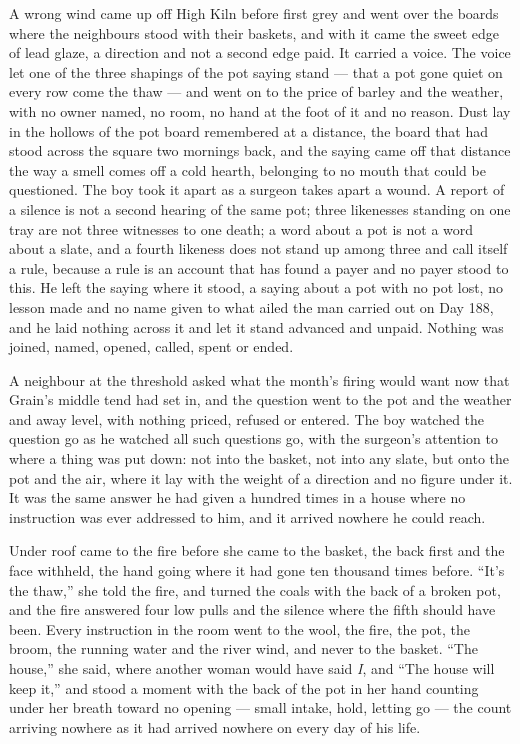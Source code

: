 \scenebreak

A wrong wind came up off High Kiln before first grey and went over the boards where the neighbours stood with their baskets, and with it came the sweet edge of lead glaze, a direction and not a second edge paid. It carried a voice. The voice let one of the three shapings of the pot saying stand --- that a pot gone quiet on every row come the thaw --- and went on to the price of barley and the weather, with no owner named, no room, no hand at the foot of it and no reason. Dust lay in the hollows of the pot board remembered at a distance, the board that had stood across the square two mornings back, and the saying came off that distance the way a smell comes off a cold hearth, belonging to no mouth that could be questioned. The boy took it apart as a surgeon takes apart a wound. A report of a silence is not a second hearing of the same pot; three likenesses standing on one tray are not three witnesses to one death; a word about a pot is not a word about a slate, and a fourth likeness does not stand up among three and call itself a rule, because a rule is an account that has found a payer and no payer stood to this. He left the saying where it stood, a saying about a pot with no pot lost, no lesson made and no name given to what ailed the man carried out on Day 188, and he laid nothing across it and let it stand advanced and unpaid. Nothing was joined, named, opened, called, spent or ended.

\scenebreak

A neighbour at the threshold asked what the month's firing would want now that Grain's middle tend had set in, and the question went to the pot and the weather and away level, with nothing priced, refused or entered. The boy watched the question go as he watched all such questions go, with the surgeon's attention to where a thing was put down: not into the basket, not into any slate, but onto the pot and the air, where it lay with the weight of a direction and no figure under it. It was the same answer he had given a hundred times in a house where no instruction was ever addressed to him, and it arrived nowhere he could reach.

Under  roof  came to the fire before she came to the basket, the back first and the face withheld, the hand going where it had gone ten thousand times before. “It's the thaw,” she told the fire, and turned the coals with the back of a broken pot, and the fire answered four low pulls and the silence where the fifth should have been. Every instruction in the room went to the wool, the fire, the pot, the broom, the running water and the river wind, and never to the basket. “The house,” she said, where another woman would have said \emph{I}, and “The house will keep it,” and stood a moment with the back of the pot in her hand counting under her breath toward no opening --- small intake, hold, letting go --- the count arriving nowhere as it had arrived nowhere on every day of his life.

